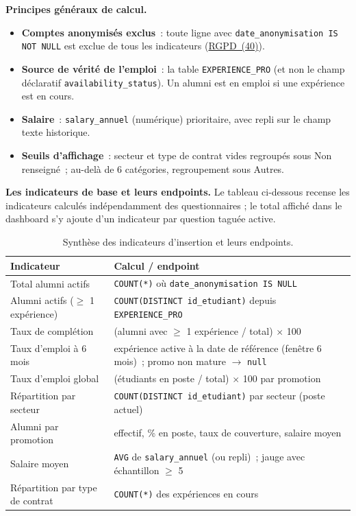 \documentclass[12pt,a4paper]{report}
\begin{document}
\textbf{Principes généraux de calcul.}
\begin{itemize}
  \item \textbf{Comptes anonymisés exclus}~: toute ligne avec \texttt{date\_anonymisation IS NOT NULL} est exclue de tous les indicateurs (\hyperlink{abbr-RGPD}{RGPD~(40)}).
  \item \textbf{Source de vérité de l'emploi}~: la table \texttt{EXPERIENCE\_PRO} (et non le champ déclaratif \texttt{availability\_status}). Un alumni est \og{}en emploi\fg{} si une expérience est en cours.
  \item \textbf{Salaire}~: \texttt{salary\_annuel} (numérique) prioritaire, avec repli sur le champ texte historique.
  \item \textbf{Seuils d'affichage}~: secteur et type de contrat vides regroupés sous \og{}Non renseigné\fg{}~; au-delà de 6 catégories, regroupement sous \og{}Autres\fg{}.
\end{itemize}

\textbf{Les indicateurs de base et leurs endpoints.} Le tableau ci-dessous recense les indicateurs calculés indépendamment des questionnaires ; le total affiché dans le dashboard s'y ajoute d'un indicateur par question taguée active.

\begin{table}[htbp]
\centering
\caption{Synthèse des indicateurs d'insertion et leurs endpoints.}
\label{tab:indicateurs-endpoints}
\begin{tabularx}{\textwidth}{@{} l >{\raggedright\arraybackslash}X @{}}
\toprule
\textbf{Indicateur} & \textbf{Calcul / endpoint} \\
\midrule
Total alumni actifs & \texttt{COUNT(*)} où \texttt{date\_anonymisation IS NULL} \\
Alumni actifs ($\geq$ 1 expérience) & \texttt{COUNT(DISTINCT id\_etudiant)} depuis \texttt{EXPERIENCE\_PRO} \\
Taux de complétion & (alumni avec $\geq$ 1 expérience / total) $\times$ 100 \\
Taux d'emploi à 6 mois & expérience active à la date de référence (fenêtre 6 mois)~; promo non mature $\rightarrow$ \texttt{null} \\
Taux d'emploi global & (étudiants en poste / total) $\times$ 100 par promotion \\
Répartition par secteur & \texttt{COUNT(DISTINCT id\_etudiant)} par secteur (poste actuel) \\
Alumni par promotion & effectif, \% en poste, taux de couverture, salaire moyen \\
Salaire moyen & \texttt{AVG} de \texttt{salary\_annuel} (ou repli)~; jauge avec échantillon $\geq$ 5 \\
Répartition par type de contrat & \texttt{COUNT(*)} des expériences en cours \\
\bottomrule
\end{tabularx}
\end{table}
\end{document}
